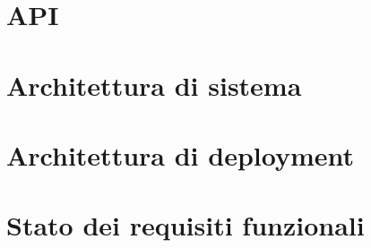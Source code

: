 \documentclass[10pt]{article}
\begin{document}
\begin{justify}
\section{API}


\section{Architettura di sistema}


\section{Architettura di deployment}


\section{Stato dei requisiti funzionali}


\end{justify}
\end{document}
